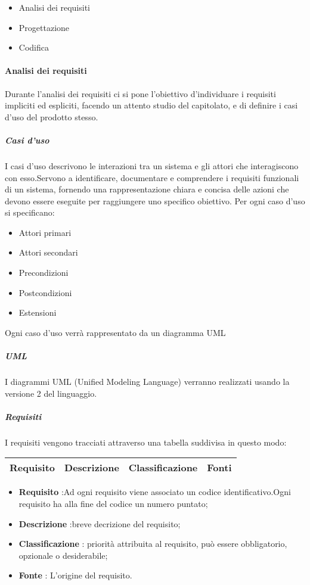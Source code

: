 \documentclass[12pt]{article}
\begin{document}
\begin{itemize}
    \item Analisi dei requisiti
    \item Progettazione
    \item Codifica
\end{itemize}

\paragraph{Analisi dei requisiti}
Durante l'analisi dei requisiti ci si pone l'obiettivo d'individuare i requisiti impliciti ed espliciti, facendo un attento studio del capitolato, e di definire i casi d'uso del prodotto stesso.
\subparagraph{Casi d'uso}
I casi d'uso descrivono le interazioni tra un sistema e gli attori che interagiscono con esso.Servono a identificare, documentare e comprendere i requisiti funzionali di un sistema, fornendo una rappresentazione chiara e concisa delle azioni che devono essere eseguite per raggiungere uno specifico obiettivo.
Per ogni caso d'uso si specificano:
\begin{itemize}
	\item Attori primari
	\item Attori secondari
	\item Precondizioni
	\item Postcondizioni
	\item Estensioni
\end{itemize}
Ogni caso d'uso verrà rappresentato da un diagramma UML
\subparagraph{UML}
I diagrammi UML (Unified Modeling Language) verranno realizzati usando la versione 2 del linguaggio.
\subparagraph{Requisiti}
I requisiti vengono tracciati attraverso una tabella suddivisa in questo modo:\par
\begin{tabular}{|c|c|c|c|}
	\hline
	Requisito & Descrizione & Classificazione & Fonti \\
	\hline
\end{tabular}

\begin{itemize}
	\item \textbf{Requisito} :Ad ogni requisito viene associato un codice identificativo.Ogni requisito ha alla fine del codice un numero puntato;
	\item \textbf{Descrizione} :breve decrizione del requisito;
	\item \textbf{Classificazione} : priorità attribuita al requisito, può essere obbligatorio, opzionale o desiderabile;
	\item \textbf{Fonte} : L'origine del requisito.
\end{itemize}
\end{document}
